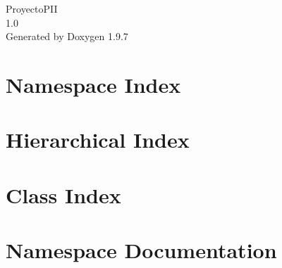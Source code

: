 \documentclass[twoside]{book}
\newcommand{\+}{\discretionary{\mbox{\scriptsize$\hookleftarrow$}}{}{}}
\newcommand{\clearemptydoublepage}{%
    \newpage{\pagestyle{empty}\cleardoublepage}%
  }
\begin{document}
  \raggedbottom
    \hypersetup{pageanchor=false,
                bookmarksnumbered=true,
                pdfencoding=unicode
               }
  \begin{titlepage}
  \vspace*{7cm}
  \begin{center}%
  {\Large Proyecto\+PII}\\
  [1ex]\large 1.\+0 \\
  \vspace*{1cm}
  {\large Generated by Doxygen 1.9.7}\\
  \end{center}
  \end{titlepage}
  \clearemptydoublepage
  \tableofcontents
  \clearemptydoublepage
  \hypersetup{pageanchor=true}

\chapter{Namespace Index}

\chapter{Hierarchical Index}

\chapter{Class Index}

\chapter{Namespace Documentation}










\end{document}
